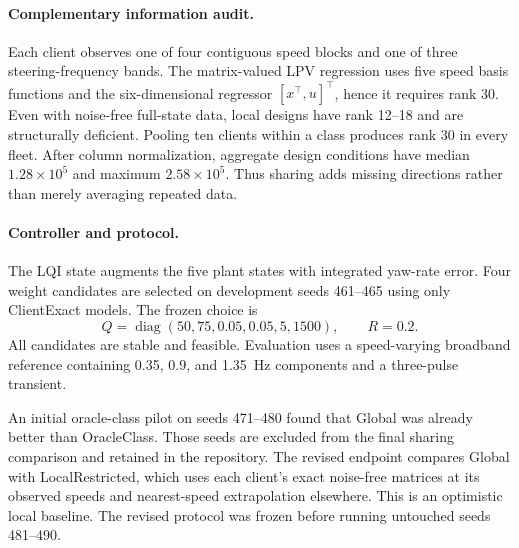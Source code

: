 \paragraph{Complementary information audit.}
Each client observes one of four contiguous speed blocks and one of three
steering-frequency bands. The matrix-valued LPV regression uses five speed
basis functions and the six-dimensional regressor $[x^\top,u]^\top$, hence it
requires rank 30. Even with noise-free full-state data, local designs have rank
12--18 and are structurally deficient. Pooling ten clients within a class
produces rank 30 in every fleet. After column normalization, aggregate design
conditions have median $1.28\times10^5$ and maximum $2.58\times10^5$. Thus
sharing adds missing directions rather than merely averaging repeated data.

\paragraph{Controller and protocol.}
The LQI state augments the five plant states with integrated yaw-rate error.
Four weight candidates are selected on development seeds 461--465 using only
ClientExact models. The frozen choice is
\begin{equation}
 Q=\operatorname{diag}(50,75,0.05,0.05,5,1500),\qquad R=0.2.
\end{equation}
All candidates are stable and feasible. Evaluation uses a speed-varying
broadband reference containing 0.35, 0.9, and 1.35~Hz components and a
three-pulse transient.

An initial oracle-class pilot on seeds 471--480 found that Global was already
better than OracleClass. Those seeds are excluded from the final sharing
comparison and retained in the repository. The revised endpoint compares
Global with LocalRestricted, which uses each client's exact noise-free matrices
at its observed speeds and nearest-speed extrapolation elsewhere. This is an
optimistic local baseline. The revised protocol was frozen before running
untouched seeds 481--490.

